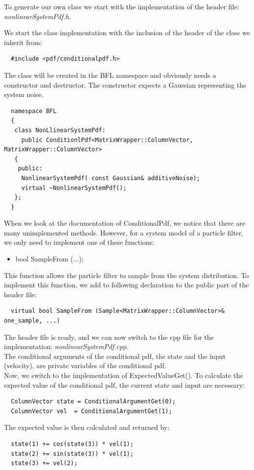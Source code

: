 \documentclass[a4paper,10pt]{report}
\begin{document}
To generate our own class we start with the implementation of the
header file: \emph{nonlinearSystemPdf.h}.

We start the class implementation with the inclusion of the header of
the class we inherit from:
\begin{verbatim}
  #include <pdf/conditionalpdf.h>
\end{verbatim}
The class will be created in the BFL namespace and obviously needs a
constructor and destructor. The constructor expects a Gaussian
representing the system noise.
\begin{verbatim}
  namespace BFL
  {
   class NonLlinearSystemPdf: 
     public ConditionlPdf<MatrixWrapper::ColumnVector, MatrixWrapper::ColumnVector>
   {
    public:
     NonlinearSystemPdf( const Gaussian& additiveNoise);
     virtual ~NonlinearSystemPdf();
   };
  }
\end{verbatim}
When we look at the documentation of ConditionalPdf, we notice that
there are many unimplemented methods. However, for a system model of a
particle filter, we only need to implement one of these functions:
\begin{itemize}
  \item bool SampleFrom (...);
\end{itemize}
This function allows the particle filter to sample from the system
distribution. To implement this function, we add to following
declaration to the public part of the header file:
\begin{verbatim}
  virtual bool SampleFrom (Sample<MatrixWrapper::ColumnVector>& one_sample, ...)
\end{verbatim}
The header file is ready, and we can now switch to the cpp file for
the implementation:
\emph{nonlinearSystemPdf.cpp}.\\
The conditional arguments of the conditional pdf, the state and the
input (velocity), are private variables of the conditional pdf.\\
Now, we switch to the implementation of ExpectedValueGet().  To
calculate the expected value of the conditional pdf, the current state
and input are necessary:
\begin{verbatim}
  ColumnVector state = ConditionalArgumentGet(0);
  ColumnVector vel  = ConditionalArgumentGet(1);
\end{verbatim}
The expected value is then calculated and returned by:
\begin{verbatim}
  state(1) += cos(state(3)) * vel(1);
  state(2) += sin(state(3)) * vel(1);
  state(3) += vel(2);
\end{verbatim}
\end{document}
